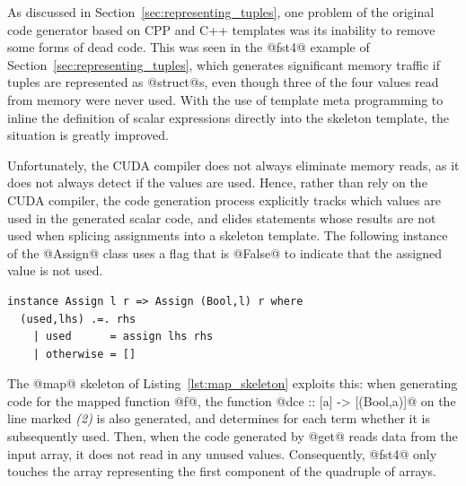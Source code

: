 As discussed in Section~\ref{sec:representing_tuples}, one problem of the
original code generator based on CPP and C++ templates was its inability to
remove some forms of dead code. This was seen in the @fst4@ example of
Section~\ref{sec:representing_tuples}, which generates significant memory
traffic if tuples are represented as @struct@s, even though three of the
four values read from memory were never used. With the use of template meta
programming to inline the definition of scalar expressions directly into the
skeleton template, the situation is greatly improved.

Unfortunately, the CUDA compiler does not always eliminate memory reads, as it
does not always detect if the values are used. Hence, rather than rely on the
CUDA compiler, the code generation process explicitly tracks which values are
used in the generated scalar code, and elides statements whose results are not
used when splicing assignments into a skeleton template. The following instance
of the @Assign@ class uses a flag that is @False@ to indicate that the assigned
value is not used.
%
\begin{lstlisting}[style=haskell]
instance Assign l r => Assign (Bool,l) r where
  (used,lhs) .=. rhs
    | used      = assign lhs rhs
    | otherwise = []
\end{lstlisting}

The @map@ skeleton of Listing~\ref{lst:map_skeleton} exploits this: when
generating code for the mapped function @f@, the function
@dce :: [a] -> [(Bool,a)]@
on the line marked \emph{(2)} is also generated, and determines for each term
whether it is subsequently used. Then, when the code generated by @get@ reads
data from the input array, it does not read in any unused values. Consequently,
@fst4@ only touches the array representing the first component of the quadruple
of arrays.

